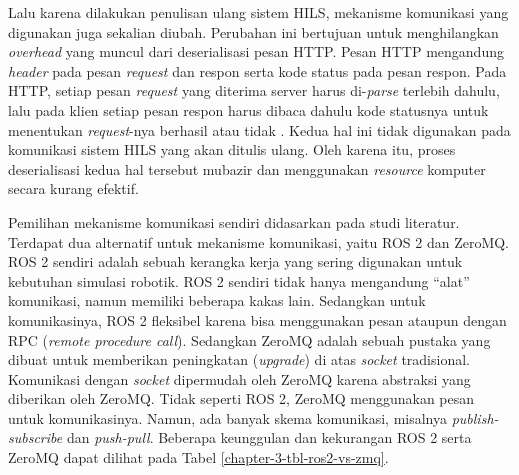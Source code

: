 Lalu karena dilakukan penulisan ulang sistem HILS, mekanisme komunikasi yang
digunakan juga sekalian diubah. Perubahan ini bertujuan untuk menghilangkan
\textit{overhead} yang muncul dari deserialisasi pesan HTTP. Pesan HTTP
mengandung \textit{header} pada pesan \textit{request} dan respon serta kode
status pada pesan respon. Pada HTTP, setiap pesan \textit{request} yang diterima
server harus di-\textit{parse} terlebih dahulu, lalu pada klien setiap pesan
respon harus dibaca dahulu kode statusnya untuk menentukan \textit{request}-nya
berhasil atau tidak \parencite{rfc9110}. Kedua hal ini tidak digunakan pada
komunikasi sistem HILS yang akan ditulis ulang. Oleh karena itu, proses
deserialisasi kedua hal tersebut mubazir dan menggunakan \textit{resource}
komputer secara kurang efektif.

Pemilihan mekanisme komunikasi sendiri didasarkan pada studi literatur.
Terdapat dua alternatif untuk mekanisme komunikasi, yaitu ROS 2 dan ZeroMQ.
ROS 2 sendiri adalah sebuah kerangka kerja yang sering digunakan untuk kebutuhan
simulasi robotik. ROS 2 sendiri tidak hanya mengandung ``alat'' komunikasi,
namun memiliki beberapa kakas lain. Sedangkan untuk komunikasinya, ROS 2
fleksibel karena bisa menggunakan pesan ataupun dengan RPC (\textit{remote
	procedure call}). Sedangkan ZeroMQ adalah sebuah pustaka yang dibuat untuk
memberikan peningkatan (\textit{upgrade}) di atas \textit{socket}
tradisional. Komunikasi dengan \textit{socket} dipermudah oleh ZeroMQ karena
abstraksi yang diberikan oleh ZeroMQ. Tidak seperti ROS 2, ZeroMQ menggunakan
pesan untuk komunikasinya. Namun, ada banyak skema komunikasi, misalnya
\textit{publish-subscribe} dan \textit{push-pull}. Beberapa keunggulan dan
kekurangan ROS 2 serta ZeroMQ dapat dilihat pada Tabel
\ref{chapter-3-tbl-ros2-vs-zmq}.

